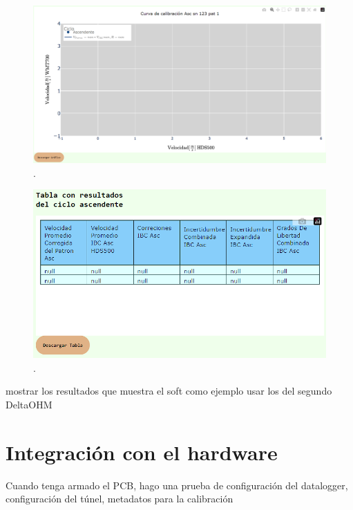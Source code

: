 \begin{figure}[H]
    \centering
    \includegraphics[width=1\linewidth]{Figuras/AplicacionWeb/frondend/curvaCalib.png}
    \caption{.}
    \label{fig:curvaCalib}
\end{figure}

\begin{figure}[H]
    \centering
    \includegraphics[width=0.6\linewidth]{Figuras/AplicacionWeb/frondend/tablaCalib.png}
    \caption{.}
    \label{fig:tablaCalib}
\end{figure}



mostrar los resultados que muestra el soft como ejemplo usar los del segundo DeltaOHM
\section{Integración con el hardware}
Cuando tenga armado el PCB, hago una prueba de configuración del datalogger, configuración del túnel, metadatos para la calibración


